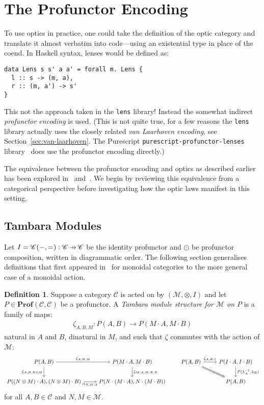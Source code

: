 \documentclass[11pt,letterpaper]{article}
\theoremstyle{plain}
\theoremstyle{definition}
\newtheorem{definition}[theorem]{Definition}
\newcommand{\C}{\mathscr{C}}
\newcommand{\M}{\mathscr{M}}
\newcommand{\lenslib}{\texttt{lens}}
\newcommand{\Prof}{\mathbf{Prof}}
\newcommand{\act}{\cdot}
\newcommand{\hto}{\ensuremath{\,\mathaccent\shortmid\rightarrow\,}}
\begin{document}
\section{The Profunctor Encoding}\label{sec:profunctor-optics}
To use optics in practice, one could take the definition of the optic category and translate it almost verbatim into code---using an existential type in place of the coend. In Haskell syntax, lenses would be defined as:
\begin{verbatim}
data Lens s s' a a' = forall m. Lens {
  l :: s -> (m, a),
  r :: (m, a') -> s'
}
\end{verbatim}
This not the approach taken in the \lenslib{} library! Instead the somewhat indirect \emph{profunctor encoding} is used. (This is not quite true, for a few reasons the \lenslib{} library actually uses the closely related \emph{van Laarhoven encoding}, see Section~\ref{sec:van-laarhoven}. The Purescript \texttt{purescript-profunctor-lenses} library~\cite{PurescriptLibrary} does use the profunctor encoding directly.)

The equivalence between the profunctor encoding and optics as described earlier has been explored in~\cite{ProfunctorOptics} and~\cite{ProfunctorOpticsPost}. We begin by reviewing this equivalence from a categorical perspective before investigating how the optic laws manifest in this setting.

\subsection{Tambara Modules}
Let $I = \C(-,{=}) : \C \hto \C$ be the identity profunctor and $\odot$ be profunctor composition, written in diagrammatic order. The following section generalises definitions that first appeared in~\cite[Section 3]{Doubles} for monoidal categories to the more general case of a monoidal action.

\begin{definition}
  Suppose a category $\C$ is acted on by $(\M, \otimes, I)$ and let $P \in \Prof(\C, \C)$ be a profunctor. A \emph{Tambara module structure for $\M$ on $P$} is a family of maps:
  \begin{align*}
    \zeta_{A,B,M} : P(A,B) \to P(M \act A, M\act B)
  \end{align*}
  natural in $A$ and $B$, dinatural in $M$, and such that $\zeta$ commutes with the action of $\M$:
  \[
    \begin{tikzcd}
      P(A,B) \ar[r, "\zeta_{A,B,M}"] \ar[d, "\zeta_{A, B, N\otimes M}" swap] & P(M \act A, M \act B) \ar[d, "\zeta_{M \act A, M \act B, N}" right] \\
      P((N\otimes M) \act A), (N\otimes M) \act B) \ar[r, "\alpha_{N, M, A}" swap] & P(N\act (M\act A), N\act (M \act B))
    \end{tikzcd}
    \qquad
    \begin{tikzcd}
      P(A,B) \ar[r, "\zeta_{A,B,I}"] \ar[dr, equal] & P(I\act A, I\act B) \ar[d, "{P(\lambda_A^{-1}, \lambda_B)}" right] \\
      & P(A, B)
    \end{tikzcd}
  \]
  for all $A, B \in \C$ and $N, M \in \M$.
\end{definition}
\end{document}
